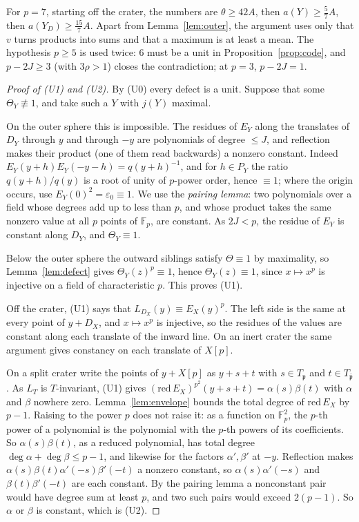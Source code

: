 \documentclass[11pt]{amsart}
\numberwithin{equation}{section}
\theoremstyle{plain}
\theoremstyle{definition}
\theoremstyle{remark}
\begin{document}
For \(p=7\), starting off the crater, the numbers are \(\theta\ge42A\), then \(a(Y)\ge\tfrac57A\), then \(a(Y_D)\ge\tfrac{15}7A\). Apart from Lemma~\ref{lem:outer}, the argument uses only that \(v\) turns products into sums and that a maximum is at least a mean. The hypothesis \(p\ge5\) is used twice: \(6\) must be a unit in Proposition~\ref{prop:code}, and \(p-2J\ge3\) (with \(3\rho>1\)) closes the contradiction; at \(p=3\), \(p-2J=1\).

\begin{proof}[Proof of \textup{(U1)} and \textup{(U2)}]
By (U0) every defect is a unit. Suppose that some \(\Theta_Y\not\equiv1\), and take such a \(Y\) with \(j(Y)\) maximal.

On the outer sphere this is impossible. The residues of \(E_Y\) along the translates of \(D_Y\) through \(y\) and through \(-y\) are polynomials of degree \(\le J\), and reflection makes their product (one of them read backwards) a nonzero constant. Indeed \(E_Y(y+h)E_Y(-y-h)=q(y+h)^{-1}\), and for \(h\in P_Y\) the ratio \(q(y+h)/q(y)\) is a root of unity of \(p\)-power order, hence \(\equiv1\); where the origin occurs, use \(E_Y(0)^2=\varepsilon_0\equiv1\). We use the \emph{pairing lemma}: two polynomials over a field whose degrees add up to less than \(p\), and whose product takes the same nonzero value at all \(p\) points of \(\mathbb F_p\), are constant. As \(2J<p\), the residue of \(E_Y\) is constant along \(D_Y\), and \(\Theta_Y\equiv1\).

Below the outer sphere the outward siblings satisfy \(\Theta\equiv1\) by maximality, so Lemma~\ref{lem:defect} gives \(\Theta_Y(z)^p\equiv1\), hence \(\Theta_Y(z)\equiv1\), since \(x\mapsto x^p\) is injective on a field of characteristic \(p\). This proves (U1).

Off the crater, (U1) says that \(L_{D_X}(y)\equiv E_X(y)^p\). The left side is the same at every point of \(y+D_X\), and \(x\mapsto x^p\) is injective, so the residues of the values are constant along each translate of the inward line. On an inert crater the same argument gives constancy on each translate of \(X[p]\).

On a split crater write the points of \(y+X[p]\) as \(y+s+t\) with \(s\in T_{\mathfrak p}\) and \(t\in T_{\bar{\mathfrak p}}\). As \(L_T\) is \(T\)-invariant, (U1) gives \((\mathrm{red}\,E_X)^{p^2}(y+s+t)=\alpha(s)\beta(t)\) with \(\alpha\) and \(\beta\) nowhere zero. Lemma~\ref{lem:envelope} bounds the total degree of \(\mathrm{red}\,E_X\) by \(p-1\). Raising to the power \(p\) does not raise it: as a function on \(\mathbb F_p^2\), the \(p\)-th power of a polynomial is the polynomial with the \(p\)-th powers of its coefficients. So \(\alpha(s)\beta(t)\), as a reduced polynomial, has total degree \(\deg\alpha+\deg\beta\le p-1\), and likewise for the factors \(\alpha',\beta'\) at \(-y\). Reflection makes \(\alpha(s)\beta(t)\alpha'(-s)\beta'(-t)\) a nonzero constant, so \(\alpha(s)\alpha'(-s)\) and \(\beta(t)\beta'(-t)\) are each constant. By the pairing lemma a nonconstant pair would have degree sum at least \(p\), and two such pairs would exceed \(2(p-1)\). So \(\alpha\) or \(\beta\) is constant, which is (U2).
\end{proof}
\end{document}
